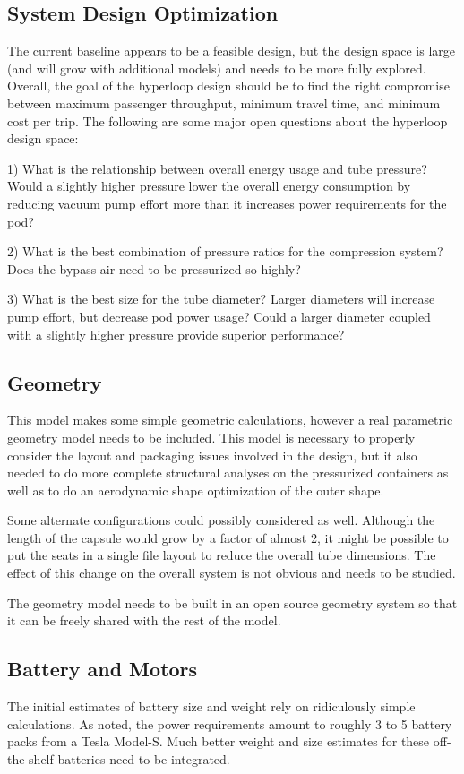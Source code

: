 \documentclass[heading.tex]{subfiles}
\begin{document}
\subsection{System Design Optimization}
The current baseline appears to be a feasible design, but the design space is large (and will grow with additional models) and needs to be more fully explored. Overall, the goal of the hyperloop design should be to find the right compromise between maximum passenger throughput, minimum travel time, and minimum cost per trip. The following are some major open questions about the hyperloop design space:

1) What is the relationship between overall energy usage and tube pressure? Would a slightly higher pressure lower the overall energy consumption by reducing vacuum pump effort more than it increases power requirements for the pod?

2) What is the best combination of pressure ratios for the compression system? Does the bypass air need to be pressurized so highly?

3) What is the best size for the tube diameter? Larger diameters will increase pump effort, but decrease pod power usage? Could a larger diameter coupled with a slightly higher pressure provide superior performance?

\subsection{Geometry}
This model makes some simple geometric calculations, however a real parametric geometry model needs to be included. This model is necessary to properly consider the layout and packaging issues involved in the design, but it also needed to do more complete structural analyses on the pressurized containers as well as to do an aerodynamic shape optimization of the outer shape.

Some alternate configurations could possibly considered as well. Although the length of the capsule would grow by a factor of almost 2, it might be possible to put the seats in a single file layout to reduce the overall tube dimensions. The effect of this change on the overall system is not obvious and needs to be studied.

The geometry model needs to be built in an open source geometry system so that it can be freely shared with the rest of the model.

\subsection{Battery and Motors}
The initial estimates of battery size and weight rely on ridiculously simple calculations. As noted, the power requirements amount to roughly 3 to 5 battery packs from a Tesla Model-S. Much better weight and size estimates for these off-the-shelf batteries need to be integrated.
\end{document}
